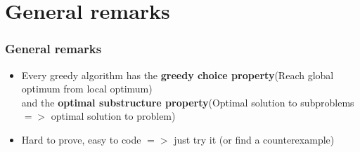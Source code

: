 \documentclass[12pt]{beamer}
\begin{document}
\section{General remarks}

\begin{frame}
	\frametitle{General remarks}
	\begin{itemize}
		\item Every greedy algorithm has the \textbf{greedy choice property}(Reach global optimum from local optimum)\\ and the \textbf{optimal substructure property}(Optimal solution to subproblems $=>$ optimal solution to problem)\\
		\pause
		\item Hard to prove, easy to code $=>$ just try it (or find a counterexample)
	\end{itemize}
\end{frame}
\end{document}
